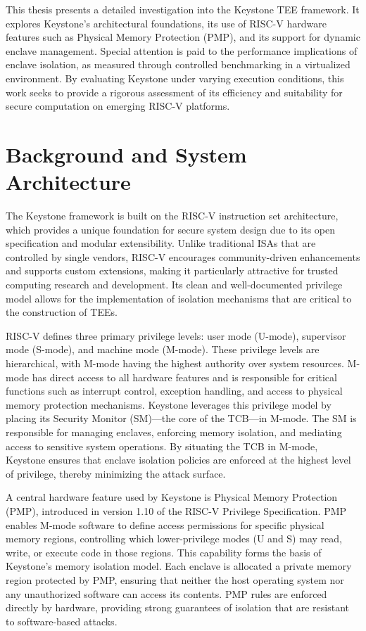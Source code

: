 \documentclass[english, version-2020-11]{uzl-thesis}
\begin{document}
This thesis presents a detailed investigation into the Keystone TEE framework. It explores Keystone's architectural foundations, its use of RISC-V hardware features such as Physical Memory Protection (PMP), and its support for dynamic enclave management. Special attention is paid to the performance implications of enclave isolation, as measured through controlled benchmarking in a virtualized environment. By evaluating Keystone under varying execution conditions, this work seeks to provide a rigorous assessment of its efficiency and suitability for secure computation on emerging RISC-V platforms.


\chapter{Background and System Architecture}
The Keystone framework is built on the RISC-V instruction set architecture, which provides a unique foundation for secure system design due to its open specification and modular extensibility. Unlike traditional ISAs that are controlled by single vendors, RISC-V encourages community-driven enhancements and supports custom extensions, making it particularly attractive for trusted computing research and development. Its clean and well-documented privilege model allows for the implementation of isolation mechanisms that are critical to the construction of TEEs.

RISC-V defines three primary privilege levels: user mode (U-mode), supervisor mode (S-mode), and machine mode (M-mode). These privilege levels are hierarchical, with M-mode having the highest authority over system resources. M-mode has direct access to all hardware features and is responsible for critical functions such as interrupt control, exception handling, and access to physical memory protection mechanisms. Keystone leverages this privilege model by placing its Security Monitor (SM)—the core of the TCB—in M-mode. The SM is responsible for managing enclaves, enforcing memory isolation, and mediating access to sensitive system operations. By situating the TCB in M-mode, Keystone ensures that enclave isolation policies are enforced at the highest level of privilege, thereby minimizing the attack surface.

A central hardware feature used by Keystone is Physical Memory Protection (PMP), introduced in version 1.10 of the RISC-V Privilege Specification. PMP enables M-mode software to define access permissions for specific physical memory regions, controlling which lower-privilege modes (U and S) may read, write, or execute code in those regions. This capability forms the basis of Keystone’s memory isolation model. Each enclave is allocated a private memory region protected by PMP, ensuring that neither the host operating system nor any unauthorized software can access its contents. PMP rules are enforced directly by hardware, providing strong guarantees of isolation that are resistant to software-based attacks.
\end{document}
